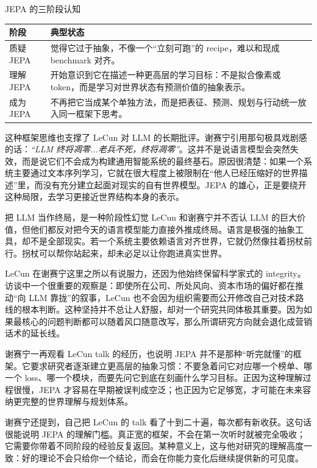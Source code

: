 \documentclass[a4paper,12pt]{article}
\begin{document}
\begin{importantbox}{JEPA 的三阶段认知}
\begin{tabularx}{\textwidth}{>{\raggedright\arraybackslash}p{} Y}
\toprule
阶段 & 典型状态 \\
\midrule
质疑 JEPA & 觉得它过于抽象，不像一个“立刻可跑”的 recipe，难以和现成 benchmark 对齐。 \\
理解 JEPA & 开始意识到它在描述一种更高层的学习目标：不是拟合像素或 token，而是学习对世界状态有预测价值的抽象表示。 \\
成为 JEPA & 不再把它当成某个单独方法，而是把表征、预测、规划与行动统一放入同一框架下思考。 \\
\bottomrule
\end{tabularx}
\end{importantbox}

这种框架思维也支撑了 LeCun 对 LLM 的长期批评。谢赛宁引用那句极具戏剧感的话：\textit{``LLM 终将凋零...老兵不死，终将凋零''}。这并不是说语言模型会突然失效，而是说它们不会成为构建通用智能系统的最终基石。原因很清楚：如果一个系统主要通过文本序列学习，它就在很大程度上被限制在“他人已经压缩好的世界描述”里，而没有充分建立起面对现实的自有世界模型。JEPA 的雄心，正是要绕开这种局限，去学习更接近世界结构本身的表示。

\begin{warningbox}{把 LLM 当作终局，是一种阶段性幻觉}
LeCun 和谢赛宁并不否认 LLM 的巨大价值，但他们都反对把今天的语言模型能力直接外推成终局。语言是极强的抽象工具，却不是全部现实。若一个系统主要依赖语言对齐世界，它就仍然像拄着拐杖前行。拐杖可以帮你站起来，却未必足以让你跑进真实世界。
\end{warningbox}

LeCun 在谢赛宁这里之所以有说服力，还因为他始终保留科学家式的 integrity。访谈中一个很重要的观察是：即使所在公司、所处风向、资本市场的偏好都在推动“向 LLM 靠拢”的叙事，LeCun 也不会因为组织需要而公开修改自己对技术路线的根本判断。这种坚持并不总让人舒服，却对一个研究共同体极其重要。因为如果最核心的问题判断都可以随着风口随意改写，那么所谓研究方向就会退化成营销话术的延长线。

谢赛宁一再观看 LeCun talk 的经历，也说明 JEPA 并不是那种“听完就懂”的框架。它要求研究者逐渐建立更高层的抽象习惯：不要急着问它对应哪一个榜单、哪一个 loss、哪一个模块，而要先问它到底在刻画什么学习目标。正因为这种理解过程很慢，JEPA 才容易在早期被误判成空泛；也正因为它足够宽，才可能在未来容纳更完整的世界理解与规划体系。

谢赛宁还提到，自己把 LeCun 的 talk 看了十到二十遍，每次都有新收获。这句话很能说明 JEPA 的理解门槛。真正宽的框架，不会在第一次听时就被完全吸收；它需要你带着不同阶段的经验反复返回。某种意义上，这与他对研究的理解高度一致：好的理论不会只给你一个结论，而会在你能力变化后继续提供新的可见度。
\end{document}
